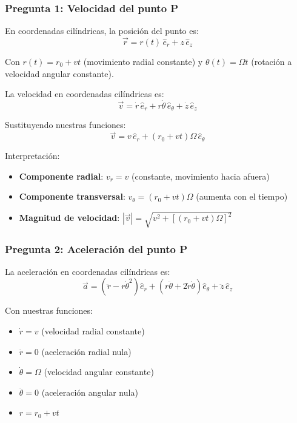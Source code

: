 
\begin{sol}

\subsubsection*{Pregunta 1: Velocidad del punto P}

En coordenadas cilíndricas, la posición del punto es:
$$\vec{r} = r(t) \, \hat{e}_r + z \, \hat{e}_z$$

Con $r(t) = r_0 + vt$ (movimiento radial constante) y $\theta(t) = \Omega t$ (rotación a velocidad angular constante).

La velocidad en coordenadas cilíndricas es:
$$\vec{v} = \dot{r} \, \hat{e}_r + r \dot{\theta} \, \hat{e}_\theta + \dot{z} \, \hat{e}_z$$

Sustituyendo nuestras funciones:
\begin{equation}
\boxed{\vec{v} = v \, \hat{e}_r + (r_0 + vt) \Omega \, \hat{e}_\theta}
\end{equation}

Interpretación:
\begin{itemize}
    \item \textbf{Componente radial}: $v_r = v$ (constante, movimiento hacia afuera)
    \item \textbf{Componente transversal}: $v_\theta = (r_0 + vt) \Omega$ (aumenta con el tiempo)
    \item \textbf{Magnitud de velocidad}: $|\vec{v}| = \sqrt{v^2 + [(r_0 + vt) \Omega]^2}$
\end{itemize}

\subsubsection*{Pregunta 2: Aceleración del punto P}

La aceleración en coordenadas cilíndricas es:
$$\vec{a} = (\ddot{r} - r\dot{\theta}^2) \hat{e}_r + (r\ddot{\theta} + 2\dot{r}\dot{\theta}) \hat{e}_\theta + \ddot{z} \, \hat{e}_z$$

Con nuestras funciones:
\begin{itemize}
    \item $\dot{r} = v$ (velocidad radial constante)
    \item $\ddot{r} = 0$ (aceleración radial nula)
    \item $\dot{\theta} = \Omega$ (velocidad angular constante)
    \item $\ddot{\theta} = 0$ (aceleración angular nula)
    \item $r = r_0 + vt$
\end{itemize}


\end{sol}
